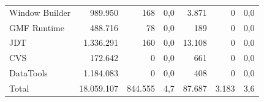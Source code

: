 \begin{table}[htbp]
\begin{tabular}{@{}lrrrrrr@{}}
        Window Builder  & 989.950   & 168     & 0,0  & 3.871  & 0     & 0,0  \\
        GMF Runtime     & 488.716   & 78      & 0,0  & 189    & 0     & 0,0  \\
        JDT             & 1.336.291 & 160     & 0,0  & 13.108 & 0     & 0,0  \\
        CVS             & 172.642   & 0       & 0,0  & 661    & 0     & 0,0  \\
        DataTools       & 1.184.083 & 0       & 0,0  & 408    & 0     & 0,0  \\
        \midrule
        Total           & 18.059.107 & 844.555 & 4,7 & 87.687 & 3.183 & 3,6 \\
        \bottomrule
    \end{tabular}
\end{table}%
